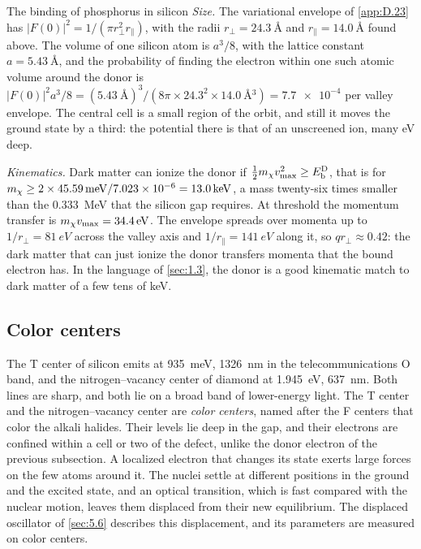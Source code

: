 \begin{workedexample}{The binding of phosphorus in silicon}
\emph{Size.} The variational envelope of \cref{app:D.23} has $|F(0)|^2 = 1/(\pi r_\perp^2r_\parallel)$, with the radii $r_\perp = \SI{24.3}{\angstrom}$ and $r_\parallel = \SI{14.0}{\angstrom}$ found above. The volume of one silicon atom is $a^3/8$, with the lattice constant $a = \SI{5.43}{\angstrom}$, and the probability of finding the electron within one such atomic volume around the donor is $|F(0)|^2a^3/8 = (\SI{5.43}{\angstrom})^3/(8\pi\times24.3^2\times\SI{14.0}{\angstrom^3}) = \num{7.7e-4}$ per valley envelope. The central cell is a small region of the orbit, and still it moves the ground state by a third: the potential there is that of an unscreened ion, many eV deep.

\emph{Kinematics.} Dark matter can ionize the donor if $\tfrac12m_{\chi} v_{\mathrm{max}}^2 \ge E_{\mathrm{b}}^{\mathrm{D}}$, that is for $m_{\chi} \ge 2\times\SI{45.59}{meV}/\num{7.023e-6} = \SI{13.0}{keV}$, a mass twenty-six times smaller than the \SI{0.333}{MeV} that the silicon gap requires. At threshold the momentum transfer is $m_{\chi} v_{\mathrm{max}} = \SI{34.4}{eV}$. The envelope spreads over momenta up to $1/r_\perp = \SI{81}{eV}$ across the valley axis and $1/r_\parallel = \SI{141}{eV}$ along it, so $qr_\perp \approx 0.42$: the dark matter that can just ionize the donor transfers momenta that the bound electron has. In the language of \cref{sec:1.3}, the donor is a good kinematic match to dark matter of a few tens of keV.
\end{workedexample}

\subsection{Color centers}

The T center of silicon emits at \SI{935}{meV}, \SI{1326}{nm} in the telecommunications O band, and the nitrogen--vacancy center of diamond at \SI{1.945}{eV}, \SI{637}{nm}. Both lines are sharp, and both lie on a broad band of lower-energy light. The T center and the nitrogen--vacancy center are \emph{color centers}, named after the F centers that color the alkali halides. Their levels lie deep in the gap, and their electrons are confined within a cell or two of the defect, unlike the donor electron of the previous subsection. A localized electron that changes its state exerts large forces on the few atoms around it. The nuclei settle at different positions in the ground and the excited state, and an optical transition, which is fast compared with the nuclear motion, leaves them displaced from their new equilibrium. The displaced oscillator of \cref{sec:5.6} describes this displacement, and its parameters are measured on color centers.

